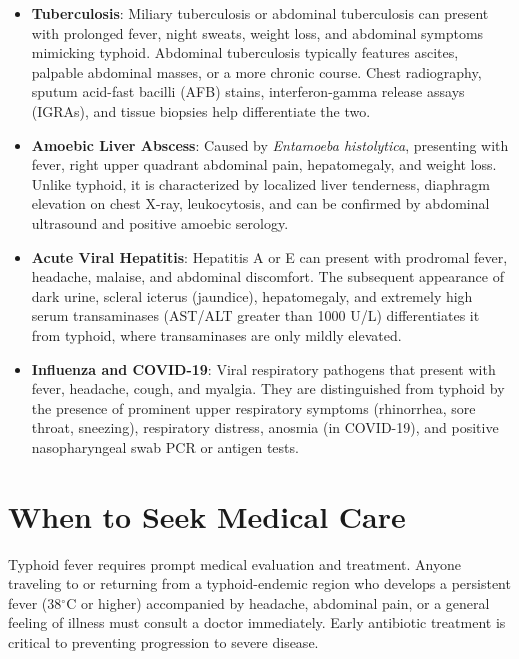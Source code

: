 \begin{itemize}
  \item \textbf{Tuberculosis}: Miliary tuberculosis or abdominal tuberculosis can present with prolonged fever, night sweats, weight loss, and abdominal symptoms mimicking typhoid. Abdominal tuberculosis typically features ascites, palpable abdominal masses, or a more chronic course. Chest radiography, sputum acid-fast bacilli (AFB) stains, interferon-gamma release assays (IGRAs), and tissue biopsies help differentiate the two.
  \item \textbf{Amoebic Liver Abscess}: Caused by \textit{Entamoeba histolytica}, presenting with fever, right upper quadrant abdominal pain, hepatomegaly, and weight loss. Unlike typhoid, it is characterized by localized liver tenderness, diaphragm elevation on chest X-ray, leukocytosis, and can be confirmed by abdominal ultrasound and positive amoebic serology.
  \item \textbf{Acute Viral Hepatitis}: Hepatitis A or E can present with prodromal fever, headache, malaise, and abdominal discomfort. The subsequent appearance of dark urine, scleral icterus (jaundice), hepatomegaly, and extremely high serum transaminases (AST/ALT greater than 1000 U/L) differentiates it from typhoid, where transaminases are only mildly elevated.
  \item \textbf{Influenza and COVID-19}: Viral respiratory pathogens that present with fever, headache, cough, and myalgia. They are distinguished from typhoid by the presence of prominent upper respiratory symptoms (rhinorrhea, sore throat, sneezing), respiratory distress, anosmia (in COVID-19), and positive nasopharyngeal swab PCR or antigen tests.
\end{itemize}

\section*{When to Seek Medical Care}
Typhoid fever requires prompt medical evaluation and treatment. Anyone traveling to or returning from a typhoid-endemic region who develops a persistent fever (38$^\circ$C or higher) accompanied by headache, abdominal pain, or a general feeling of illness must consult a doctor immediately. Early antibiotic treatment is critical to preventing progression to severe disease.

